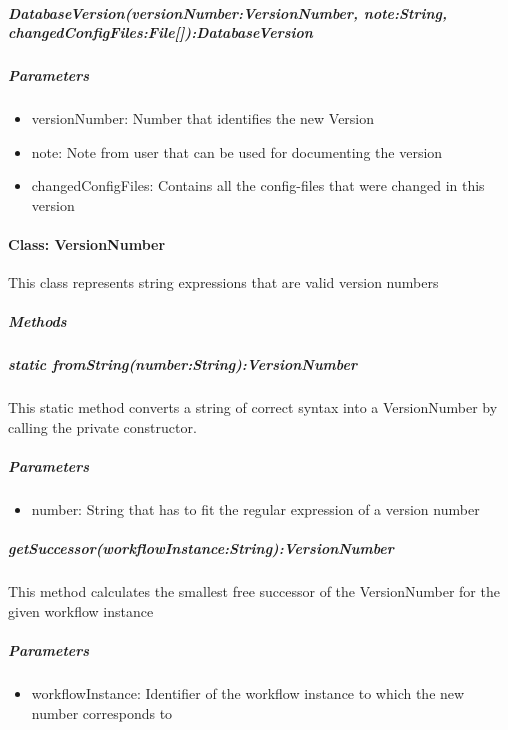 \subparagraph{DatabaseVersion(versionNumber:VersionNumber, note:String, changedConfigFiles:File[]):DatabaseVersion}

\subparagraph{Parameters}
\begin{itemize}
	\item{versionNumber:}
	Number that identifies the new Version
	\item{note:}
	Note from user that can be used for documenting the version
	\item{changedConfigFiles:}
	Contains all the config-files that were changed in this version
\end{itemize}


\paragraph{Class: VersionNumber}
This class represents string expressions that are valid version numbers
\subparagraph{Methods}

\subparagraph{static fromString(number:String):VersionNumber}
This static method converts a string of correct syntax into a VersionNumber by calling the private constructor.

\subparagraph{Parameters}
\begin{itemize}
	\item{number:}
	String that has to fit the regular expression of a version number
\end{itemize}

\subparagraph{getSuccessor(workflowInstance:String):VersionNumber}
This method calculates the smallest free successor of the VersionNumber for the given workflow instance

\subparagraph{Parameters}
\begin{itemize}
	\item{workflowInstance:}
	Identifier of the workflow instance to which the new number corresponds to
\end{itemize}